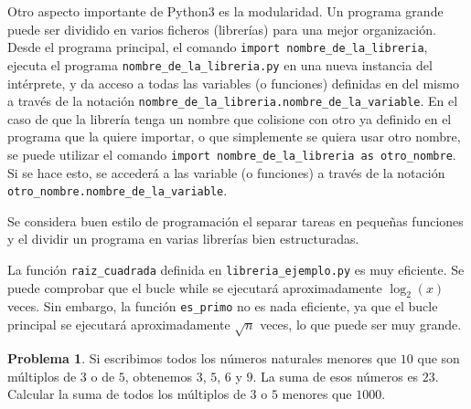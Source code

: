 \documentclass[a4paper, 11pt]{article}
\newcounter{numerodetema}
\theoremstyle{plain}
\theoremstyle{definition}
\newtheorem{prob}{Problema}[numerodetema]
\begin{document}


\bigskip

Otro aspecto importante de Python3 es la modularidad. Un programa grande puede
ser dividido en varios ficheros (librerías) para una mejor organización. Desde
el programa principal, el comando \texttt{import nombre\_de\_la\_libreria}, ejecuta
el programa \texttt{nombre\_de\_la\_libreria.py} en una nueva instancia del
intérprete, y da acceso a todas las variables (o funciones) definidas en del mismo
a través de la notación \texttt{nombre\_de\_la\_libreria.nombre\_de\_la\_variable}.
En el caso de que la librería tenga un nombre que colisione con otro ya definido en
el programa que la quiere importar, o que simplemente se quiera usar otro nombre,
se puede utilizar el comando \texttt{import nombre\_de\_la\_libreria as otro\_nombre}.
Si se hace esto, se accederá a las variable (o funciones) a través de la notación
\texttt{otro\_nombre.nombre\_de\_la\_variable}.

\bigskip



\bigskip



\bigskip

Se considera buen estilo de programación el separar tareas en pequeñas funciones
y el dividir un programa en varias librerías bien estructuradas.

\bigskip

La función \texttt{raiz\_cuadrada} definida en \texttt{libreria\_ejemplo.py} es
muy eficiente. Se puede comprobar que el bucle while se ejecutará aproximadamente
$\log_2(x)$ veces. Sin embargo, la función \texttt{es\_primo} no es nada eficiente,
ya que el bucle principal se ejecutará aproximadamente $\sqrt{n}$ veces, lo que
puede ser muy grande.

\bigskip

\begin{prob}
Si escribimos todos los números naturales menores que $10$ que son múltiplos de
$3$ o de $5$, obtenemos $3$, $5$, $6$ y $9$. La suma de esos números es $23$.
Calcular la suma de todos los múltiplos de $3$ o $5$ menores que $1000$.
\end{prob}
\end{document}
